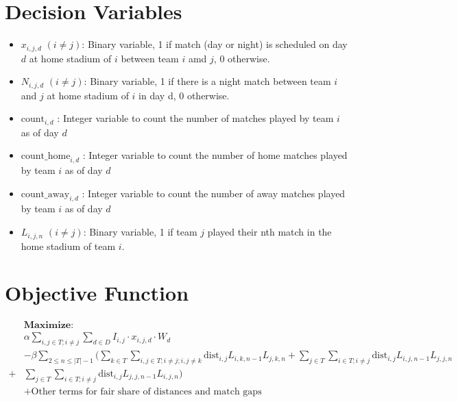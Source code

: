 \documentclass[a4paper, 12pt]{article}
\begin{document}
\section*{Decision Variables}
\begin{itemize}
    \item $x_{i,j,d}$ $(i \neq j)$: Binary variable, 1 if match (day or night) is scheduled on day $d$ at home stadium of $i$ between team $i$ amd $j$, 0 otherwise.
    \item $N_{i,j,d}$ $(i \neq j)$: Binary variable, 1 if there is a night match between team $i$ and $j$ at home stadium of $i$ in day d, 0 otherwise.
    \item $\text{count}_{i,d}$ : Integer variable to count the number of matches played by team $i$ as of day $d$
    \item $\text{count\_home}_{i,d}$ : Integer variable to count the number of home matches played by team $i$ as of day $d$
    \item $\text{count\_away}_{i,d}$ : Integer variable to count the number of away matches played by team $i$ as of day $d$
    \item $L_{i,j,n}$ $(i \neq j)$: Binary variable, 1 if team $j$ played their nth match in the home stadium of team $i$.
    
\end{itemize}

\section*{Objective Function}
\begin{align*}
&\textbf{Maximize: }\\ 
&\alpha \sum_{i,j \in T; i \neq j} \sum_{d \in D} I_{i,j} \cdot x_{i,j,d} \cdot W_{d} \\ 
&- \beta \sum_{2 \leq n \leq |T| - 1} (\sum_{k \in T} \sum_{i,j \in T; i \neq j; i,j \neq k}  \text{dist}_{i,j}L_{i,k,n-1}L_{j,k,n} + 
\sum_{j \in T}\sum_{i \in T;i \neq j} \text{dist}_{i,j}L_{i,j,n-1}L_{j,j,n} \\ + & \sum_{j \in T}\sum_{i \in T; i \neq j} \text{dist}_{i,j}L_{j,j,n-1}L_{i,j,n}) \\ &+ \text{Other terms for fair share of distances and match gaps}
\end{align*}
\end{document}
